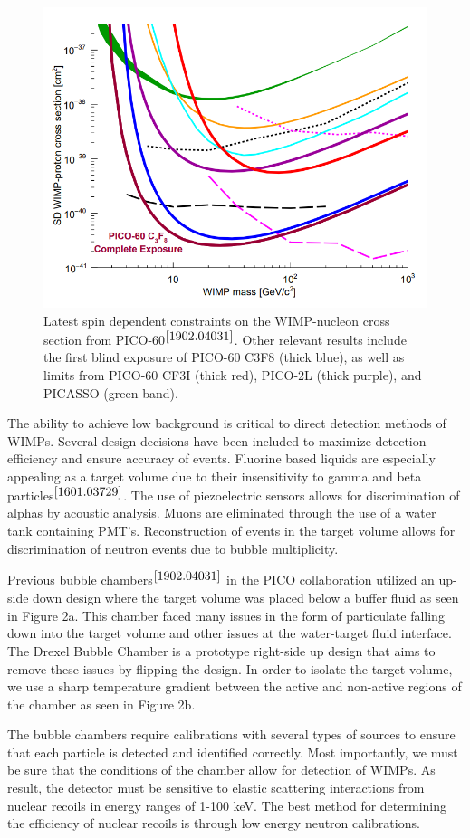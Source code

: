 \documentclass[%
12pt,
twoside,
reprint,
amsmath,amssymb,
aps,
]{article}
\begin{document}
	\begin{figure}
		\includegraphics[scale = 0.4, center]{Images/constraints.png}
		\caption{\label{tab:table-name} Latest spin dependent constraints on the WIMP-nucleon cross section from PICO-60$^{\cite{1902.04031}}$. Other relevant results include the first blind exposure of PICO-60 C3F8 (thick blue), as well as limits from PICO-60 CF3I (thick red), PICO-2L (thick purple), and PICASSO (green band).}
	\end{figure}
	
	\par The ability to achieve low background is critical to direct detection methods of WIMPs. Several design decisions have been included to maximize detection efficiency and ensure accuracy of events. Fluorine based liquids are especially appealing as a target volume due to their insensitivity to gamma and beta particles$^{\cite{1601.03729}}$. The use of piezoelectric sensors allows for discrimination of alphas by acoustic analysis. Muons are eliminated through the use of a water tank containing PMT's. Reconstruction of events in the target volume allows for discrimination of neutron events due to bubble multiplicity. 
	\par Previous bubble chambers$^{\cite{1902.04031}}$ in the PICO collaboration utilized an up-side down design where the target volume was placed below a buffer fluid as seen in Figure 2a. This chamber faced many issues in the form of particulate falling down into the target volume and other issues at the water-target fluid interface. The Drexel Bubble Chamber is a prototype right-side up design that aims to remove these issues by flipping the design. In order to isolate the target volume, we use a sharp temperature gradient between the active and non-active regions of the chamber as seen in Figure 2b.
	\par The bubble chambers require calibrations with several types of sources to ensure that each particle is detected and identified correctly. Most importantly, we must be sure that the conditions of the chamber allow for detection of WIMPs. As result, the detector must be sensitive to elastic scattering interactions from nuclear recoils in energy ranges of 1-100 keV. The best method for determining the efficiency of nuclear recoils is through low energy neutron calibrations. 
	
\end{document}
